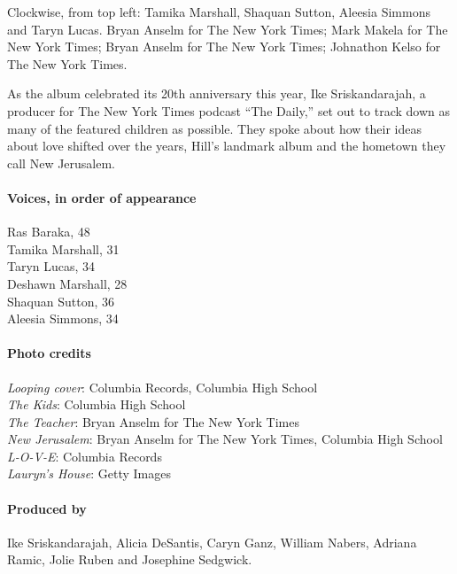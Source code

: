 Clockwise, from top left: Tamika Marshall, Shaquan Sutton, Aleesia
Simmons and Taryn Lucas. Bryan Anselm for The New York Times; Mark
Makela for The New York Times; Bryan Anselm for The New York Times;
Johnathon Kelso for The New York Times.

As the album celebrated its 20th anniversary this year, Ike
Sriskandarajah, a producer for The New York Times podcast ``The Daily,''
set out to track down as many of the featured children as possible. They
spoke about how their ideas about love shifted over the years, Hill's
landmark album and the hometown they call New Jerusalem.

\hypertarget{voices-in-order-of-appearance}{%
\paragraph{Voices, in order of
appearance}\label{voices-in-order-of-appearance}}

Ras Baraka, 48\\
Tamika Marshall, 31\\
Taryn Lucas, 34\\
Deshawn Marshall, 28\\
Shaquan Sutton, 36\\
Aleesia Simmons, 34

\hypertarget{photo-credits}{%
\paragraph{Photo credits}\label{photo-credits}}

\emph{Looping cover}: Columbia Records, Columbia High School\\
\emph{The Kids}: Columbia High School\\
\emph{The Teacher}: Bryan Anselm for The New York Times\\
\emph{New Jerusalem}: Bryan Anselm for The New York Times, Columbia High
School\\
\emph{L-O-V-E}: Columbia Records\\
\emph{Lauryn's House}: Getty Images

\hypertarget{produced-by}{%
\paragraph{Produced by}\label{produced-by}}

Ike Sriskandarajah, Alicia DeSantis, Caryn Ganz, William Nabers, Adriana
Ramic, Jolie Ruben and Josephine Sedgwick.

